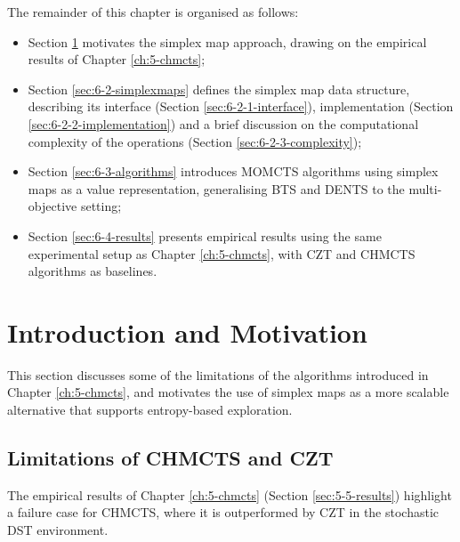     The remainder of this chapter is organised as follows:
    \begin{itemize}
        \item 
            Section \ref{sec:6-1-intro} motivates the simplex map approach, drawing on the empirical results of Chapter \ref{ch:5-chmcts};
        \item 
            Section \ref{sec:6-2-simplexmaps} defines the simplex map data structure, describing its interface (Section \ref{sec:6-2-1-interface}), implementation (Section \ref{sec:6-2-2-implementation}) and a brief discussion on the computational complexity of the operations (Section \ref{sec:6-2-3-complexity});
        \item 
            Section \ref{sec:6-3-algorithms} introduces MOMCTS algorithms using simplex maps as a value representation, generalising BTS and DENTS to the multi-objective setting;
        \item 
            Section \ref{sec:6-4-results} presents empirical results 
            using the same experimental setup as Chapter 
            \ref{ch:5-chmcts}, with CZT and CHMCTS algorithms as baselines.
    \end{itemize}









\section{Introduction and Motivation}
\label{sec:6-1-intro}

    This section discusses some of the limitations of the algorithms introduced in Chapter \ref{ch:5-chmcts}, and motivates the use of simplex maps as a more scalable alternative that supports entropy-based exploration.

\subsection{Limitations of CHMCTS and CZT}

    The empirical results of Chapter \ref{ch:5-chmcts} (Section \ref{sec:5-5-results}) highlight a failure case for CHMCTS, where it is outperformed by CZT in the stochastic DST environment.

